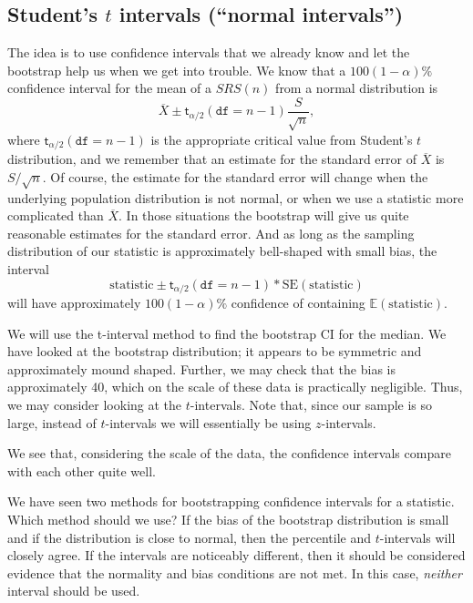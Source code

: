 \documentclass[captions=tableheading]{scrbook}
\begin{document}
\subsection{Student's \(t\) intervals (``normal intervals'')}
\label{sec-13-3-2}


The idea is to use confidence intervals that we already know and let the bootstrap help us when we get into trouble. We know that a \(100(1-\alpha)\%\) confidence interval for the mean of a \(SRS(n)\) from a normal distribution is 
\begin{equation} 
\overline{X}\pm\mathsf{t}_{\alpha/2}(\mathtt{df}=n-1)\frac{S}{\sqrt{n}},
\end{equation} 
where \(\mathsf{t}_{\alpha/2}(\mathtt{df}=n-1)\) is the appropriate critical value from Student's \(t\) distribution, and we remember that an estimate for the standard error of \(\overline{X}\) is \(S/\sqrt{n}\). Of course, the estimate for the standard error will change when the underlying population distribution is not normal, or when we use a statistic more complicated than \(\overline{X}\). In those situations the bootstrap will give us quite reasonable estimates for the standard error. And as long as the sampling distribution of our statistic is approximately bell-shaped with small bias, the interval 
\begin{equation}
\mbox{statistic}\pm\mathsf{t}_{\alpha/2}(\mathtt{df}=n-1)*\mathrm{SE}(\mbox{statistic})
\end{equation}
 will have approximately \(100(1-\alpha)\%\) confidence of containing \(\mathbb{E}(\mathrm{statistic})\). 

\begin{example}
We will use the t-interval method to find the bootstrap CI for the median. We have looked at the bootstrap distribution; it appears to be symmetric and approximately mound shaped. Further, we may check that the bias is approximately 40, which on the scale of these data is practically negligible. Thus, we may consider looking at the \(t\)-intervals. Note that, since our sample is so large, instead of \(t\)-intervals we will essentially be using \(z\)-intervals. 
\end{example}

We see that, considering the scale of the data, the confidence intervals compare with each other quite well.

\begin{rem}
We have seen two methods for bootstrapping confidence intervals for a statistic. Which method should we use? If the bias of the bootstrap distribution is small and if the distribution is close to normal, then the percentile and \(t\)-intervals will closely agree. If the intervals are noticeably different, then it should be considered evidence that the normality and bias conditions are not met. In this case, \emph{neither} interval should be used.
\end{rem}
\end{document}
